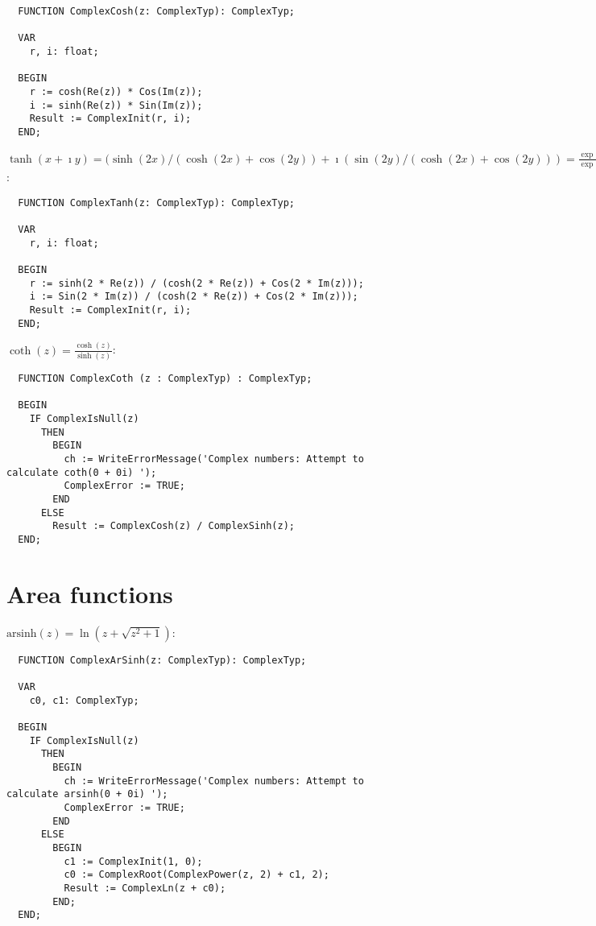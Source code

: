 \begin{refsection}
\begin{lstlisting}
  FUNCTION ComplexCosh(z: ComplexTyp): ComplexTyp;

  VAR
    r, i: float;

  BEGIN
    r := cosh(Re(z)) * Cos(Im(z));
    i := sinh(Re(z)) * Sin(Im(z));
    Result := ComplexInit(r, i);
  END;
\end{lstlisting}

\( \tanh(x + \imath y) = (\sinh(2 x)/(\cosh(2 x) + \cos(2 y)) + \imath (\sin(2 y)/(\cosh(2 x) + \cos(2 y)))  = \frac{\exp(z) - \exp(-z)}{\exp(z) + \exp(-z)} \):

\begin{lstlisting}
  FUNCTION ComplexTanh(z: ComplexTyp): ComplexTyp;

  VAR
    r, i: float;

  BEGIN
    r := sinh(2 * Re(z)) / (cosh(2 * Re(z)) + Cos(2 * Im(z)));
    i := Sin(2 * Im(z)) / (cosh(2 * Re(z)) + Cos(2 * Im(z)));
    Result := ComplexInit(r, i);
  END;
\end{lstlisting}

\( \coth(z) = \frac{\cosh(z)}{\sinh(z)} \):

\begin{lstlisting}
  FUNCTION ComplexCoth (z : ComplexTyp) : ComplexTyp;

  BEGIN
    IF ComplexIsNull(z)
      THEN
        BEGIN
          ch := WriteErrorMessage('Complex numbers: Attempt to calculate coth(0 + 0i) ');
          ComplexError := TRUE;
        END
      ELSE
        Result := ComplexCosh(z) / ComplexSinh(z);
  END;
\end{lstlisting}

\section{Area functions}

\( \mathrm{arsinh}(z) = \ln(z + \sqrt{z^2 + 1}) \):

\begin{lstlisting}
  FUNCTION ComplexArSinh(z: ComplexTyp): ComplexTyp;

  VAR
    c0, c1: ComplexTyp;

  BEGIN
    IF ComplexIsNull(z)
      THEN
        BEGIN
          ch := WriteErrorMessage('Complex numbers: Attempt to calculate arsinh(0 + 0i) ');
          ComplexError := TRUE;
        END
      ELSE
        BEGIN
          c1 := ComplexInit(1, 0);
          c0 := ComplexRoot(ComplexPower(z, 2) + c1, 2);
          Result := ComplexLn(z + c0);
        END;
  END;
\end{lstlisting}


\end{refsection}
